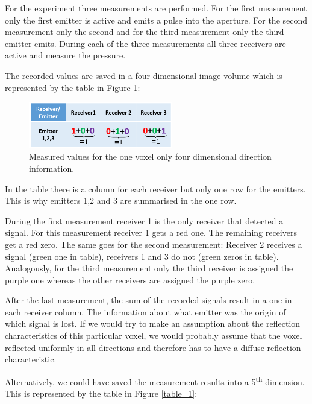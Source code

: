 For the experiment three measurements are performed. For the first measurement only the first emitter is active and emits a pulse into the aperture. For the second measurement only the second and for the third measurement only the third emitter emits. During each of the three measurements all three receivers are active and measure the pressure. 

The recorded values are saved in a four dimensional image volume which is represented by the table in Figure \ref{table_2}: 

\begin{figure}[H]
    \centering
    \includegraphics[width=0.56\textwidth]{Graphics/Diskussion/4D_not_enough_table_2.png}
    \caption{Measured values for the one voxel only four dimensional direction information.}
    \label{table_2}
\end{figure}

In the table there is a column for each receiver but only one row for the emitters. This is why emitters 1,2 and 3 are summarised in the one row.

During the first measurement receiver 1 is the only receiver that detected a signal. For this measurement receiver 1 gets a red one. The remaining receivers get a red zero. The same goes for the second measurement: Receiver 2 receives a signal (green one in table), receivers 1 and 3 do not (green zeros in table). Analogously, for the third measurement only the third receiver is assigned the purple one whereas the other receivers are assigned the purple zero.

\bigskip

After the last measurement, the sum of the recorded signals result in a one in each receiver column. The information about what emitter was the origin of which signal is lost. If we would try to make an assumption about the reflection characteristics of this particular voxel, we would probably assume that the voxel reflected uniformly in all directions and therefore has to have a diffuse reflection characteristic.

\bigskip

Alternatively, we could have saved the measurement results into a 5\textsuperscript{th} dimension. This is represented by the table in Figure \ref{table_1}:

